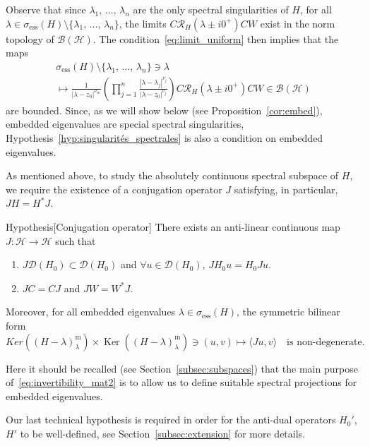 \documentclass[10pt]{amsart}
\theoremstyle{definition}\newtheorem{defi}[theo]{Definition}\newtheorem{rema}[theo]{Remark}\newtheorem{exam}[theo]{Example}\newtheorem{exem}[theo]{Example}\newtheorem{nota}[theo]{Notation}
\newcommand{\Hi}{\mathcal{H}}
\newcommand{\ess}{\mathrm{ess}}
\newcommand{\Res}{\mathcal{R}}
\newcommand{\clB}{\mathcal{B}}
\newcommand{\clD}{\mathcal{D}}
\DeclareMathOperator{\Ker}{Ker}
\newcommand*{\romanenumi}{\renewcommand*{\theenumi}{\roman{enumi}}}
\let\oldforall\forall
\renewcommand*{\forall}{\mathrel{\oldforall}}
\begin{document}
Observe that since $\lambda_1,\,\dots,\,\lambda_n$ are the only spectral singularities of $H$, for all $\lambda\in \sigma_{\ess}(H)\setminus\{\lambda_1,\,\dots,\,\lambda_n\}$, the limits $C\Res_H(\lambda\pm i0^+)CW$ exist in the norm topology of $\clB(\Hi)$. The condition~\eqref{eq:limit_uniform} then implies that the maps
\begin{multline}
\sigma_{\ess}(H)\setminus\{\lambda_1,\,\dots,\,\lambda_n\} \ni \lambda \\
\mapsto \frac{1}{|\lambda-z_0|^{\nu_\infty}} \left(\prod_{j=1}^n\frac{ |\lambda-\lambda_j|^{\nu_j} }{ |\lambda-z_0|^{\nu_j} } \right) C\Res_H\left(\lambda\pm i0^+\right)C W \in \clB(\Hi)
\end{multline}
are bounded. Since, as we will show below (see Proposition~\ref{cor:embed}), embedded eigenvalues are special spectral singularities, Hypothesis~\ref{hyp:singularités_spectrales} is also a condition on embedded eigenvalues.


As mentioned above, to study the absolutely continuous spectral subspace of $H$, we require the existence of a conjugation operator $J$ satisfying, in particular, $JH=H^* J$.

\begin{enonce}
{Hypothesis}[Conjugation operator]\label{hyp:Conjugate_operator}
There exists an anti-linear continuous map $J:\Hi\to\Hi$ such that
\begin{enumerate}\romanenumi
\item $J\clD(H_0)\subset\clD(H_0)$ and $\forall u\in\clD(H_0)$, $JH_0u=H_0Ju$.
\item $JC=CJ$ and $JW=W^* J$.
\end{enumerate}
Moreover, for all embedded eigenvalues $\lambda\in\sigma_{\ess}(H)$, the symmetric bilinear form
\begin{equation}\label{eq:invertibility_mat2}
Ker((H-\lambda)^\mathrm{m}_\lambda)\times\Ker((H-\lambda)^\mathrm{m}_\lambda) \ni (u,v)\mapsto \langle Ju,v\rangle \quad\text{is non-degenerate}.
\end{equation}
\end{enonce}

Here it should be recalled (see Section~\ref{subsec:subspaces}) that the main purpose of~\eqref{eq:invertibility_mat2} is to allow us to define suitable spectral projections for embedded eigenvalues.


Our last technical hypothesis is required in order for the anti-dual operators $H_0'$, $H'$ to be well-defined, see Section~\ref{subsec:extension} for more details.
\end{document}
